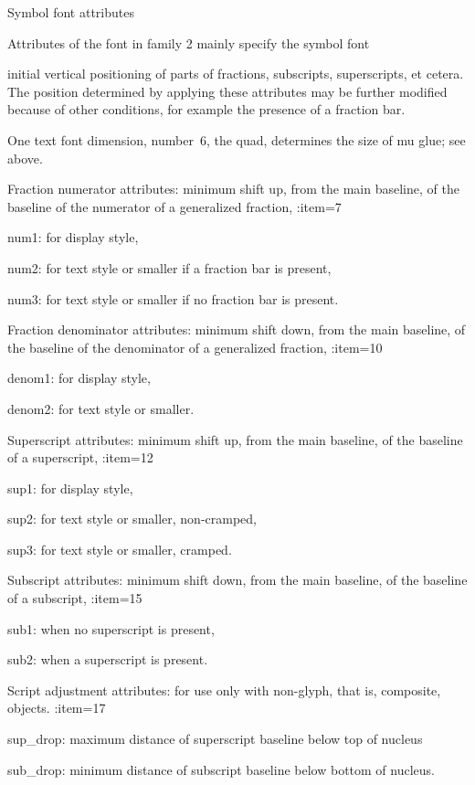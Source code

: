 \spoint Symbol font attributes

Attributes of the font in family 2 mainly specify the
\term symbol font\par
initial vertical positioning
of parts of fractions, subscripts, superscripts, et cetera.
The position determined by applying these
attributes may be further modified because of other
conditions, for example the presence of a fraction bar.

One text font dimension, number~6,
the quad, determines the size of mu glue;
see above.

Fraction numerator attributes: minimum shift up, from
the main baseline, of the baseline of the numerator
of a generalized fraction,
\enumerate \SetCounter:item=7
\item num1:
 for display style,
\item num2:
 for text style or smaller if a fraction bar is present,
\item num3:
 for text style or smaller if no fraction bar is present.
\>

Fraction denominator attributes: minimum shift down, from
the main baseline, of the baseline of the denominator
of a generalized fraction,
\enumerate \SetCounter:item=10
\item denom1:
for display style,
\item denom2:
for text style or smaller.
\>

Superscript attributes: minimum shift up, from the main baseline,
of the baseline of a superscript,
\enumerate \SetCounter:item=12
\item sup1:
for display style,
\item sup2:
for text style or smaller, non-cramped,
\item sup3:
for text style or smaller, cramped.
\>

Subscript attributes: minimum shift down, from the main baseline,
of the baseline of a subscript,
\enumerate \SetCounter:item=15
\item sub1:
when no superscript is present,
\item sub2:
when a superscript is present.
\>

Script adjustment attributes: for use only with non-glyph,
that is, composite, objects.
\enumerate \SetCounter:item=17
\item sup\_drop:
maximum distance of superscript baseline below top of nucleus
\item sub\_drop:
minimum distance of subscript baseline below bottom of nucleus.
\>

